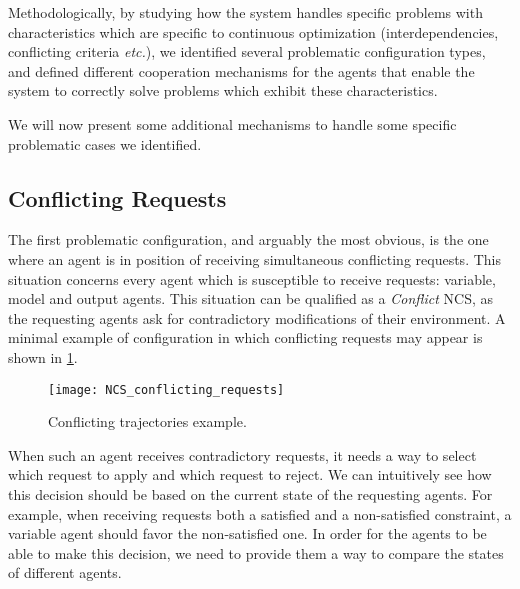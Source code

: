 Methodologically, by studying how the system handles specific problems with characteristics which are specific to continuous optimization (interdependencies, conflicting criteria \emph{etc.}), we identified several problematic configuration types, and defined different cooperation mechanisms for the agents that enable the system to correctly solve problems which exhibit these characteristics.

We will now present some additional mechanisms to handle some specific problematic cases we identified.

\subsection{Conflicting Requests}\label{conflicting_requests_mechanism}

The first problematic configuration, and arguably the most obvious, is the one where an agent is in position of receiving simultaneous conflicting requests. This situation concerns every agent which is susceptible to receive requests: variable, model and output agents. This situation can be qualified as a \emph{Conflict} NCS, as the requesting agents ask for contradictory modifications of their environment. A minimal example of configuration in which conflicting requests may appear is shown in \figurename{} \ref{NCS_conflicting_requests}.

\begin{figure}
\centering
\texttt{[image: NCS\_conflicting\_requests]}
\caption{Conflicting trajectories example.}\label{NCS_conflicting_requests}
\end{figure}

When such an agent receives contradictory requests, it needs a way to select which request to apply and which request to reject. We can intuitively see how this decision should be based on the current state of the requesting agents. For example, when receiving requests both a satisfied and a non-satisfied constraint, a variable agent should favor the non-satisfied one. In order for the agents to be able to make this decision, we need to provide them a way to compare the states of different agents.

